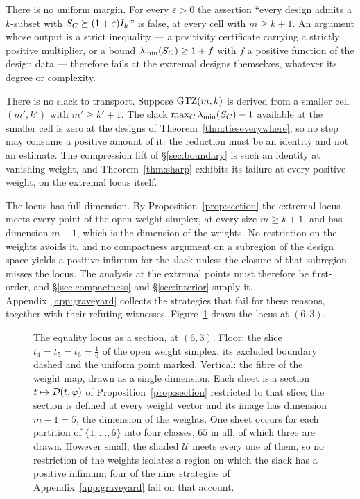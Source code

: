 There is no uniform margin.  For every $\varepsilon>0$ the assertion
``every design admits a $k$-subset with $S_{C}\succeq(1+\varepsilon)I_k$'' is
false, at every cell with $m\ge k+1$.  An argument whose output is a
strict inequality --- a positivity certificate carrying a strictly
positive multiplier, or a bound $\lambda_{\min}(S_{C})\ge1+f$ with $f$ a positive
function of the design data --- therefore fails at the extremal designs
themselves, whatever its degree or complexity.

There is no slack to transport.  Suppose $\mathrm{GTZ}(m,k)$ is derived from a
smaller cell $(m',k')$ with $m'\ge k'+1$.  The slack
$\max_C\lambda_{\min}(S_{C})-1$ available at the smaller cell is zero at the designs
of Theorem~\ref{thm:tieseverywhere}, so no step may consume a positive
amount of it: the reduction must be an identity and not an estimate.  The
compression lift of \S\ref{sec:boundary} is such an identity at vanishing
weight, and Theorem~\ref{thm:sharp} exhibits its failure at every positive
weight, on the extremal locus itself.

The locus has full dimension.  By
Proposition~\ref{prop:section} the extremal locus meets every point of the
open weight simplex, at every size $m\ge k+1$, and has dimension $m-1$,
which is the dimension of the weights.  No restriction on the weights
avoids it, and no compactness argument on a subregion of the design space
yields a positive infimum for the slack unless the closure of that
subregion misses the locus.  The analysis at the extremal points must
therefore be first-order, and \S\ref{sec:compactness} and
\S\ref{sec:interior} supply it.  Appendix~\ref{app:graveyard} collects
the strategies that fail for these reasons, together with their refuting
witnesses.  Figure~\ref{fig:section} draws the locus at $(6,3)$.

\begin{figure}[ht]
  \centering
  
  \caption{The equality locus as a section, at $(6,3)$.  Floor: the slice
  $t_4=t_5=t_6=\tfrac16$ of the open weight simplex, its excluded boundary
  dashed and the uniform point marked.  Vertical: the fibre of the weight
  map, drawn as a single dimension.  Each sheet is a section
  $t\mapsto\mathcal{D}(t,\varphi)$ of Proposition~\ref{prop:section} restricted to
  that slice; the section is defined at every weight vector and its image has
  dimension $m-1=5$, the dimension of the weights.  One sheet occurs for each
  partition of $\{1,\dots,6\}$ into four classes, $65$ in all, of which three
  are drawn.  However small, the shaded $\mathcal{U}$ meets every one of them,
  so no restriction of the weights isolates a region on which the slack has a
  positive infimum; four of the nine strategies of
  Appendix~\ref{app:graveyard} fail on that account.}
  \label{fig:section}
\end{figure}

